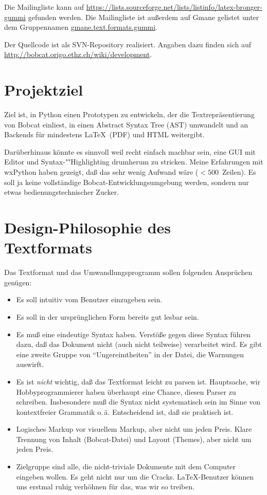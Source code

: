 \documentclass[12pt,openany]{book}
\begin{document}
Die Mailingliste kann auf
\url{https://lists.sourceforge.net/lists/listinfo/latex-bronger-gummi} gefunden
werden.  Die Mailingliste ist außerdem auf Gmane gelistet unter dem
Gruppennamen \url{gmane.text.formats.gummi}.

Der Quellcode ist als SVN-Repository realisiert.  Angaben dazu finden sich auf
\url{http://bobcat.origo.ethz.ch/wiki/development}.


\section{Projektziel}

Ziel ist, in Python einen Prototypen zu entwickeln, der die Textrepräsentierung
von Bobcat einliest, in einen Abstract Syntax Tree (AST) umwandelt und an
Backends für mindestens \LaTeX\ (PDF) und HTML weitergibt.

Darüberhinaus könnte es sinnvoll weil recht einfach machbar sein, eine GUI mit
Editor und Syn\-tax-""High\-ligh\-ting drumherum zu stricken.  Meine
Erfahrungen mit wxPython haben gezeigt, daß das sehr wenig Aufwand wäre
($<500$~Zeilen).  Es soll ja keine vollständige Bobcat-Entwicklungsumgebung
werden, sondern nur etwas bedienungstechnischer Zucker.


\section{Design-Philosophie des Textformats}

Das Textformat und das Umwandlungsprogramm sollen folgenden Ansprüchen genügen:

\begin{itemize}
\item Es soll intuitiv vom Benutzer einzugeben sein.
\item Es soll in der ursprünglichen Form bereits gut lesbar sein.
\item Es muß eine eindeutige Syntax haben.  Verstöße gegen diese Syntax führen
  dazu, daß das Dokument nicht (auch nicht teilweise) verarbeitet wird.  Es
  gibt eine zweite Gruppe von "`Ungereimtheiten"' in der Datei, die Warnungen
  auswirft.
\item Es ist \emph{nicht} wichtig, daß das Textformat leicht zu parsen ist.
  Hauptsache, wir Hobbyprogrammierer haben überhaupt eine Chance, diesen Parser
  zu schreiben.  Insbesondere muß die Syntax nicht systematisch sein im Sinne
  von kontextfreier Grammatik o.\,ä.  Entscheidend ist, daß sie praktisch ist.
\item Logisches Markup vor visuellem Markup, aber nicht um jeden Preis.  Klare
  Trennung von Inhalt (Bobcat-Datei) und Layout (Themes), aber nicht um jeden
  Preis.
\item Zielgruppe sind alle, die nicht-triviale Dokumente mit dem Computer
  eingeben wollen.  Es geht nicht nur um die Cracks.  \LaTeX-Benutzer können
  uns erstmal ruhig verhöhnen für das, was wir so treiben.
\end{itemize}
\end{document}
